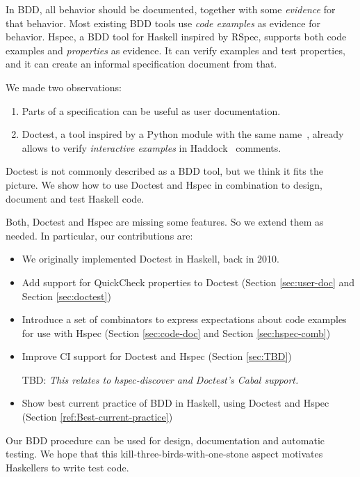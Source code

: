 \documentclass[preprint]{sigplanconf}
\begin{document}
In BDD, all behavior should be documented, together with some
\emph{evidence} for that behavior.  Most existing BDD tools use
\emph{code examples} as evidence for behavior.
Hspec, a BDD tool for Haskell inspired by RSpec, supports
both code examples and \emph{properties} as evidence.
It can verify examples and test properties, and it can create an
informal specification document from that.

We made two observations:
\begin{enumerate}
    \item
        Parts of a specification can be useful as user documentation.
    \item
        Doctest, a tool inspired by a Python module with the same
        name~\cite{doctest}, already allows to verify
        \emph{interactive examples} in Haddock~\cite{haddock} comments.
\end{enumerate}

\noindent Doctest is not commonly described as a BDD tool, but we
think it fits the picture.
We show how to use Doctest and Hspec in combination to design,
document and test Haskell code.

Both, Doctest and Hspec are missing some features.  So we extend them
as needed.  In particular, our contributions are:

\begin{itemize}
\item
    We originally implemented Doctest in Haskell, back in 2010.
\item
    Add support for QuickCheck properties to Doctest (Section
    \ref{sec:user-doc} and Section \ref{sec:doctest})

\item
    Introduce a set of combinators to express expectations about
    code examples for use with Hspec (Section \ref{sec:code-doc} and Section \ref{sec:hspec-comb})

\item
    Improve CI support for Doctest and Hspec (Section \ref{sec:TBD})

    TBD:
    \emph{This relates to hspec-discover and Doctest's Cabal support.}

\item
    Show best current practice of BDD in Haskell, using Doctest and
    Hspec (Section \ref{ref:Best-current-practice})

\end{itemize}

\noindent Our BDD procedure
can be used for design, documentation and automatic testing.
We hope that this kill-three-birds-with-one-stone aspect
motivates Haskellers to write test code.
\end{document}
